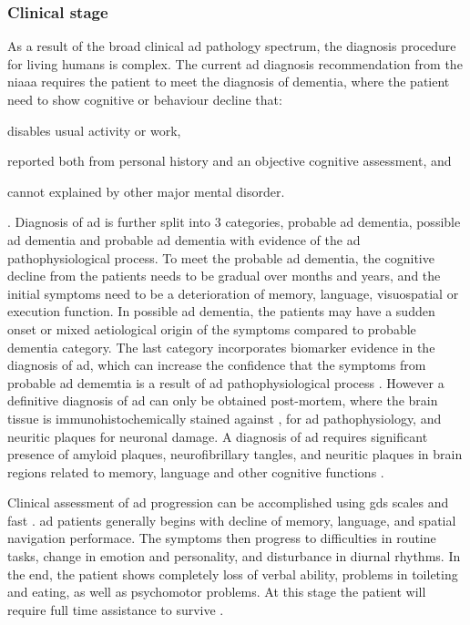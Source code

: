 \subsubsection{Clinical stage}
As a result of the broad clinical \gls{ad} pathology spectrum, the diagnosis procedure for living humans is complex. The current \gls{ad} diagnosis recommendation from the \gls{niaaa} requires the patient to meet the diagnosis of dementia, where the patient need to show cognitive or behaviour decline that:
\begin{enumerate*}[label={\alph*)}, font={\bfseries}]
    \item disables usual activity or work, 
    \item reported both from personal history and an objective cognitive assessment, and
    \item cannot explained by other major mental disorder.
\end{enumerate*} \citep{mckhann11}.
Diagnosis of \gls{ad} is further split into 3 categories, probable \gls{ad} dementia, possible \gls{ad} dementia and probable \gls{ad} dementia with evidence of the \gls{ad} pathophysiological process. To meet the probable \gls{ad} dementia, the cognitive decline from the patients needs to be gradual over months and years, and the initial symptoms need to be a deterioration of memory, language, visuospatial or execution function. In possible \gls{ad} dementia, the patients may have a sudden onset or mixed aetiological origin of the symptoms compared to probable dementia category. The last category incorporates biomarker evidence in the diagnosis of \gls{ad}, which can increase the confidence that the symptoms from probable \gls{ad} dememtia is a result of \gls{ad} pathophysiological process \citep{mckhann11}. However a definitive diagnosis of \gls{ad} can only be obtained post-mortem, where the brain tissue is immunohistochemically stained against \abeta{}, \atau{} for \gls{ad} pathophysiology, and neuritic plaques for neuronal damage. A diagnosis of \gls{ad} requires significant presence of amyloid plaques, neurofibrillary tangles, and neuritic plaques in brain regions related to memory, language and other cognitive functions \citep{hyman12}.

Clinical assessment of \gls{ad} progression can be accomplished using \gls{gds} scales \citep{reisberg82} and \gls{fast} \citep{sclan92}. \gls{ad} patients generally begins with decline of memory, language, and spatial navigation performace. The symptoms then progress to difficulties in routine tasks, change in emotion and personality, and disturbance in diurnal rhythms. In the end, the patient shows completely loss of verbal ability, problems in toileting and eating, as well as psychomotor problems. At this stage the patient will require full time assistance to survive \citep{reisberg82, sclan92}.

